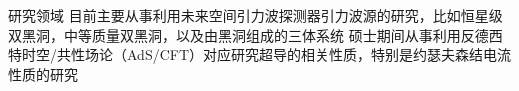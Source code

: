 
\begin{rubric}{研究领域}
    目前主要从事利用未来空间引力波探测器引力波源的研究，比如恒星级双黑洞，中等质量双黑洞，以及由黑洞组成的三体系统 
\entry*[全息超导]
    硕士期间从事利用反德西特时空/共性场论（AdS/CFT）对应研究超导的相关性质，特别是约瑟夫森结电流性质的研究 
\end{rubric}

